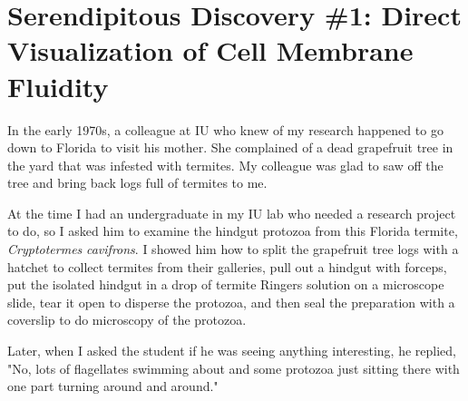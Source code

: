 \documentclass[authordate, editorial]{jote-new-article}
\author[1]{\mbox{Sidney L. Tamm\orcid{0000-0002-4756-778X}}}
\affil[1]{Marine Biological Laboratory (MBL), Woods Hole, Massachusetts, United States}
\begin{document}
\begin{frontmatter}
  \maketitle
  \begin{abstract}
    \printabstracttext
  \end{abstract}
\end{frontmatter}





	\section{Serendipitous Discovery \#1: Direct Visualization of Cell Membrane Fluidity}







	In the early 1970s, a colleague at IU who knew of my research happened to go down to Florida to visit his mother. She complained of a dead grapefruit tree in the yard that was infested with termites. My colleague was glad to saw off the tree and bring back logs full of termites to me.







	At the time I had an undergraduate in my IU lab who needed a research project to do, so I asked him to examine the hindgut protozoa from this Florida termite, \emph{Cryptotermes}\emph{ }\emph{cavifrons}. I showed him how to split the grapefruit tree logs with a hatchet to collect termites from their galleries, pull out a hindgut with forceps, put the isolated hindgut in a drop of termite Ringers solution on a microscope slide, tear it open to disperse the protozoa, and then seal the preparation with a coverslip to do microscopy of the protozoa.










	Later, when I asked the student if he was seeing anything interesting, he replied, "No, lots of flagellates swimming about and some protozoa just sitting there with one part turning around and around."
\end{document}
